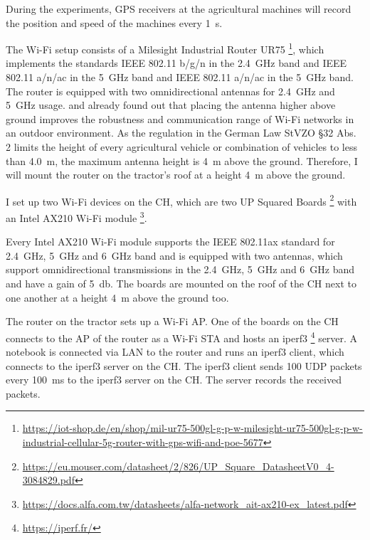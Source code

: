 During the experiments, \ac{GPS} receivers at the agricultural machines will record the position and speed of the machines every \SI{1}{\second}.

The Wi-Fi setup consists of a Milesight Industrial Router UR75 \footnote{\url{https://iot-shop.de/en/shop/mil-ur75-500gl-g-p-w-milesight-ur75-500gl-g-p-w-industrial-cellular-5g-router-with-gps-wifi-and-poe-5677}}, which implements the standards IEEE 802.11 b/g/n in the \SI{2.4}{\giga\hertz} band and IEEE 802.11 a/n/ac in the \SI{5}{\giga\hertz} band and
IEEE 802.11 a/n/ac in the \SI{5}{\giga\hertz} band.
The router is equipped with two omnidirectional antennas for  \SI{2.4}{\giga\hertz} and \SI{5}{\giga\hertz} usage.
\textcite{brinkhoff_characterization_2017} and \textcite{paul_characterizing_2011}  already found out that placing the antenna higher above ground improves
the robustness and communication range of Wi-Fi networks in an outdoor environment.
As the regulation in the German Law StVZO §32 Abs. 2 limits the height of
every agricultural vehicle or combination of vehicles to less than \SI{4.0}{\metre}, the maximum antenna height is \SI{4}{\metre} above the ground. Therefore, I will mount the router on the tractor's roof at a height \SI{4}{\metre} above the ground.

I set up two Wi-Fi devices on the \ac{CH}, which are two UP Squared Boards \footnote{\url{https://eu.mouser.com/datasheet/2/826/UP_Square_DatasheetV0_4-3084829.pdf}} with an Intel AX210 Wi-Fi module \footnote{\url{https://docs.alfa.com.tw/datasheets/alfa-network_ait-ax210-ex_latest.pdf}}.

Every Intel AX210 Wi-Fi module supports the IEEE 802.11ax standard for \SI{2.4}{\giga\hertz}, \SI{5}{\giga\hertz} and \SI{6}{\giga\hertz} band and is equipped with two antennas,
which support omnidirectional transmissions in the \SI{2.4}{\giga\hertz}, \SI{5}{\giga\hertz} and \SI{6}{\giga\hertz} band and have a gain of \SI{5}{\decibel}.
The boards are mounted on the roof of the \ac{CH} next to one another at a height \SI{4}{\metre} above the ground too.

The router on the tractor sets up a Wi-Fi \ac{AP}.
One of the boards on the \ac{CH} connects to the \ac{AP} of the router as a Wi-Fi \ac{STA} and hosts an iperf3 \footnote{\url{https://iperf.fr/}} server.
A notebook is connected via LAN to the router and runs an iperf3 client, which connects to the iperf3 server on the \ac{CH}.
The iperf3 client sends \SI{100}{\byte} \ac{UDP} packets every \SI{100}{\milli\second} to the iperf3 server on the \ac{CH}.
The server records the received packets.


